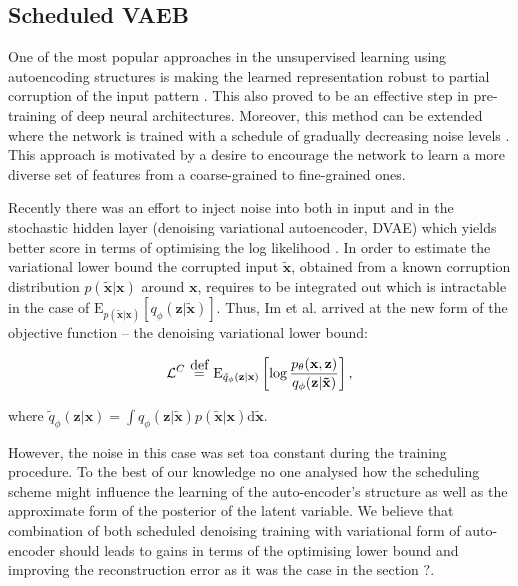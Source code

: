 \documentclass[../report.tex]{subfiles}
\begin{document}
\subsection{Scheduled VAEB}
One of the most popular approaches in the unsupervised learning using autoencoding structures is making the learned representation robust to partial corruption of the input pattern \cite{vincentDAE}. This also proved to be an effective step in pre-training of deep neural architectures. Moreover, this method can be extended where the network is trained with a schedule of gradually decreasing noise levels \cite{sutton}.  This approach is motivated by a desire to encourage the network to learn a more diverse set of features from a coarse-grained to fine-grained ones.

Recently there was an effort to inject noise into both in input and in the stochastic hidden layer (denoising variational autoencoder, DVAE) which yields better score in terms of optimising the log likelihood \cite{bengioDVAE}. In order to estimate the variational lower bound the corrupted input $\mathbf{\widetilde{x}}$,  obtained from a known corruption distribution $p (\mathbf{\widetilde{x}} | \mathbf{x})$ around $\mathbf{x}$, requires to be integrated out which is intractable in the case of $\text{E}_{p (\mathbf{\widetilde{x}} | \mathbf{x})} \left[ q_{\phi}(\mathbf{z} | \mathbf{\widetilde{x}} )\right]$. Thus, Im et al. arrived at the new form of the objective function -- the denoising variational lower bound:

$$\mathcal{L}^{C} ~ \myeq ~ \text{E}_{\tilde{q}_\phi (\mathbf{z} | \mathbf{x})} \left[ 
\log \frac{p_{\theta} (\mathbf{x, z})}{q_\phi (\mathbf{z} | \mathbf{\tilde{x}})}
\right], $$

where $\tilde{q}_\phi (\mathbf{z} | \mathbf{x}) = \int q_\phi (\mathbf{z}| \mathbf{\tilde{x}}) p(\mathbf{\tilde{x}} | \mathbf{x}) \text{d}\mathbf{\tilde{x}}$. 

However, the noise in this case was set toa  constant during the training procedure. To the best of our knowledge no one analysed how the scheduling scheme might influence the learning of the auto-encoder's structure as well as the approximate form of the posterior of the latent variable. We believe that combination of both scheduled denoising training with variational form of auto-encoder should leads to gains in terms of the optimising lower bound and improving the reconstruction error as it was the case in the section $?$.
\end{document}

